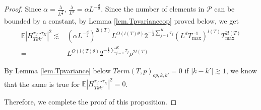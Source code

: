 \begin{proof}
Since $\alpha=\frac{\lambda}{L^{\frac{d}{2}}}$, $\frac{\lambda}{L^{d}}=\alpha L^{-\frac{d}{2}}$. Since the number of elements in $\mathcal{P}$ can be bounded by a constant, by Lemma \ref{lem.Tpvarianceop} proved below, we get
\begin{equation}
\begin{split}
    \mathbb{E}|H^{\tau_1\cdots \tau_{K}}_{Tkk'}|^2\lesssim& (\alpha L^{-\frac{d}{2}})^{2l(T)}
    L^{O(l(T)\theta)}2^{-\frac{1}{2}\sum_{j=1}^K \tau_{j}} (L^dT^{-1}_{\text{max}})^{l(T)} T_{\text{max}}^{2l(T)}
    \\
    =& L^{O(l(T)\theta)} 2^{-\frac{1}{2}\sum_{j=1}^K \tau_{j}} \rho^{2l(T)}
\end{split}
\end{equation}

By Lemma \ref{lem.Tpvariance} below $Term(T, p)_{op,k,k
    '}=0$ if $|k-k'|\gtrsim 1$, we know that the same is true for $\mathbb{E}|H^{\tau_1\cdots \tau_{K}}_{Tkk'}|^2=0$. 

Therefore, we complete the proof of this proposition.
\end{proof}


